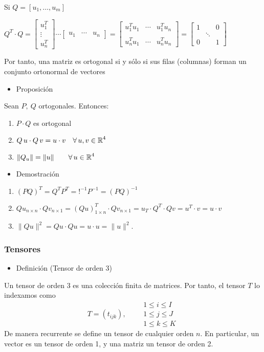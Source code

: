 Si $Q=[u_1,\dots,u_m]$

$Q^T\cdot Q=\begin{bmatrix}
	u_1^T\\
	\vdots\\
	u_n^T
\end{bmatrix}\cdots\begin{bmatrix}
u_1 & \cdots & u_n
\end{bmatrix}=\begin{bmatrix}
u_1^Tu_1 & \cdots & u_1^Tu_n \\
&  &  \\
u_n^Tu_1 & \cdots & u_n^Tu_n
\end{bmatrix}=\begin{bmatrix}
1 &  & 0 \\
& \ddots &  \\
0 &  & 1
\end{bmatrix}$

Por tanto, una matriz es ortogonal si y sólo si sus filas (columnas) forman un conjunto ortonormal de vectores
\begin{itemize}[label=\color{red}\textbullet, leftmargin=*]
	\item \color{lightblue}Proposición
\end{itemize}
Sean $P,\:Q$ ortogonales. Entonces:
\begin{enumerate}[label=\color{lightblue}\arabic*)]
	\item $P\cdot Q$ es ortogonal
	\item $Q\,u\cdot Q\,v=u\cdot v\quad\forall\,u,v\in\operatorname{\mathbb{R}}^4$
	\item $\|Q_u\|=\|u\|\qquad\forall\,u\in\operatorname{\mathbb{R}}^4$
\end{enumerate}
\begin{itemize}[label=\color{red}\textbullet, leftmargin=*]
	\item \color{lightblue}Demostración
\end{itemize}
\begin{enumerate}[label=\color{lightblue}\arabic*)]
	\item $(PQ)^T=Q^TP^T=!^{-1}P^{-1}=(PQ)^{-1}$
	\item $Qu_{n\times n}\cdot Qv_{n\times1}=(Qu)_{1\times n}^T\cdot Qv_{n\times 1}=u_T\cdot Q^T\cdot Qv=u^T\cdot v=u\cdot v$
	\item $\|Qu\|^2=Qu\cdot Qu=u\cdot u =\|u\|^2$.
\end{enumerate}
\subsubsection{Tensores}
\begin{itemize}[label=\color{red}\textbullet, leftmargin=*]
	\item \color{lightblue}Definición (Tensor de orden 3)
\end{itemize}
Un tensor de orden 3 es una colección finita de matrices. Por tanto, el tensor $T$ lo indexamos como \[ T=(t_{ijk}),\qquad\begin{array}{l}
	1\le i\le I\\
	1\le j\le J\\
	1\le k\le K
\end{array} \] De manera recurrente se define un tensor de cualquier orden $n$. En particular, un vector es un tensor de orden 1, y una matriz un tensor de orden 2.